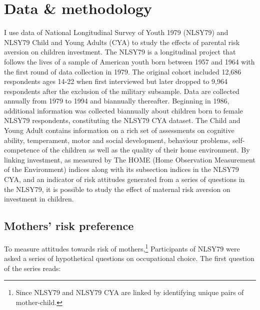 \documentclass[]{article}
\begin{document}
\section{Data \& methodology}
I use data of National Longitudinal Survey of Youth 1979 (NLSY79) and NLSY79 Child and Young Adults (CYA) to study the effects of parental risk aversion on children investment. The NLSY79 is a longitudinal project that follows the lives of a sample of American youth born between 1957 and 1964 with the first round of data collection in 1979. The original cohort included 12,686 respondents ages 14-22 when first interviewed but later dropped to 9,964 respondents after the exclusion of the military subsample. Data are collected annually from 1979 to 1994 and biannually thereafter. Beginning in 1986, additional information was collected biannually about children born to female NLSY79 respondents, constituting the NLSY79 CYA dataset. The Child and Young Adult contains information on a rich set of assessments on cognitive ability, temperament, motor and social development, behaviour problems, self-competence of the children as well as the quality of their home environment. By linking investment, as measured by The HOME (Home Observation Measurement of the Environment) indices along with its subsection indices in the NLSY79 CYA, and an indicator of risk attitudes generated from a series of questions in the NLSY79, it is possible to study the effect of maternal risk aversion on investment in children.

\subsection{Mothers' risk preference}
To measure attitudes towards risk of mothers,\footnote{Since NLSY79 and NLSY79 CYA are linked by identifying unique pairs of mother-child.} Participants of NLSY79 were asked a series of hypothetical questions on occupational choice. The first question of the series reads:
\end{document}
